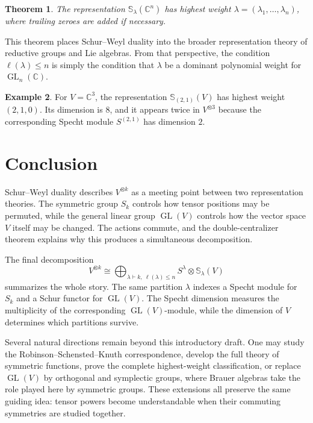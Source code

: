 \documentclass[12pt,a4paper]{article}
\newtheorem{theorem}{Theorem}[section]
\theoremstyle{definition}
\newtheorem{example}[theorem]{Example}
\theoremstyle{remark}
\newcommand{\C}{\mathbb{C}}
\newcommand{\GL}{\operatorname{GL}}
\newcommand{\Schur}[1]{\mathbb{S}_{#1}}
\begin{document}
\begin{theorem}
The representation \(\Schur{\lambda}(\C^n)\) has highest weight
\(\lambda=(\lambda_1,\dots,\lambda_n)\), where trailing zeroes are added if
necessary.
\end{theorem}

This theorem places Schur--Weyl duality into the broader representation
theory of reductive groups and Lie algebras.  From that perspective, the
condition \(\ell(\lambda)\le n\) is simply the condition that \(\lambda\) be a
dominant polynomial weight for \(\GL_n(\C)\).

\begin{example}
For \(V=\C^3\), the representation \(\Schur{(2,1)}(V)\) has highest weight
\((2,1,0)\).  Its dimension is \(8\), and it appears twice in
\(V^{\otimes 3}\) because the corresponding Specht module \(S^{(2,1)}\) has
dimension \(2\).
\end{example}

\section{Conclusion}

Schur--Weyl duality describes \(V^{\otimes k}\) as a meeting point between
two representation theories.  The symmetric group \(S_k\) controls how
tensor positions may be permuted, while the general linear group \(\GL(V)\)
controls how the vector space \(V\) itself may be changed.  The actions
commute, and the double-centralizer theorem explains why this produces a
simultaneous decomposition.

The final decomposition
\[
V^{\otimes k}
  \cong
  \bigoplus_{\lambda\vdash k,\ \ell(\lambda)\le n}
  S^\lambda\otimes \Schur{\lambda}(V)
\]
summarizes the whole story.  The same partition \(\lambda\) indexes a Specht
module for \(S_k\) and a Schur functor for \(\GL(V)\).  The Specht dimension
measures the multiplicity of the corresponding \(\GL(V)\)-module, while the
dimension of \(V\) determines which partitions survive.

Several natural directions remain beyond this introductory draft.  One may
study the Robinson--Schensted--Knuth correspondence, develop the full theory
of symmetric functions, prove the complete highest-weight classification, or
replace \(\GL(V)\) by orthogonal and symplectic groups, where Brauer algebras
take the role played here by symmetric groups.  These extensions all preserve
the same guiding idea: tensor powers become understandable when their
commuting symmetries are studied together.

\printbibliography
\end{document}
